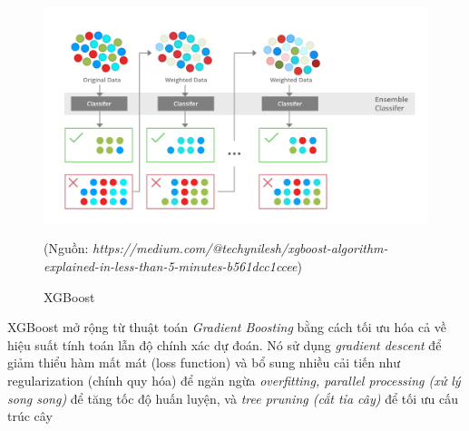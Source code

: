 \documentclass[13pt]{article}
\begin{document}
\begin{enumerate}
\begin{enumerate}
    \begin{figure}[h!]
        \centering        \includegraphics[width=0.7\linewidth]{image/h11.png}
            \caption{XGBoost}
            \label{fig:label1}
            (Nguồn: \textit{https://medium.com/@techynilesh/xgboost-algorithm-explained-in-less-than-5-minutes-b561dcc1ccee})
    \end{figure} 

        XGBoost mở rộng từ thuật toán \textit{Gradient Boosting} bằng cách tối ưu hóa cả về hiệu suất tính toán lẫn độ chính xác dự đoán. Nó sử dụng \textit{gradient descent} để giảm thiểu hàm mất mát (loss function) và bổ sung nhiều cải tiến như regularization (chính quy hóa) để ngăn ngừa \textit{overfitting, parallel processing (xử lý song song)} để tăng tốc độ huấn luyện, và \textit{tree pruning (cắt tỉa cây)} để tối ưu cấu trúc cây
        

\end{enumerate}
\end{enumerate}
\end{document}
